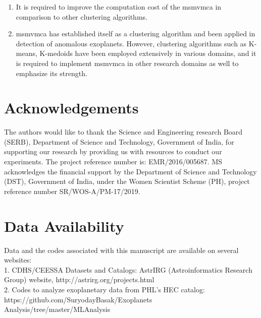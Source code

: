 \documentclass[fleqn,usenatbib]{mnras}
\begin{document}
\begin{enumerate}
\item It is required to improve the computation cost of the \acrshort{msmvmca} in comparison to other clustering algorithms.
\item \acrshort{msmvmca} has established itself as a clustering algorithm and been applied in detection of anomalous exoplanets. However, clustering algorithms such as K-means, K-medoids have been employed extensively in various domains, and it is required to implement \acrshort{msmvmca} in other research domains as well to emphasize its strength.
\end{enumerate}

\section*{Acknowledgements}

The authors would like to thank the Science and Engineering research Board (SERB), Department of Science and Technology, Government of India, for supporting our research by providing us with resources to conduct our experiments. The project reference number is: EMR/2016/005687. MS acknowledges the financial support by the Department of Science and Technology (DST), 
Government of India, under the Women Scientist Scheme (PH), project reference number SR/WOS-A/PM-17/2019.
 
\section*{Data Availability}

Data and the codes associated with this manuscript are available on several websites:\\
1. CDHS/CEESSA Datasets and Catalogs:
AstrIRG (Astroinformatics Research Group) website, http://astrirg.org/projects.html\\
2. Codes to analyze exoplanetary data from PHL's HEC catalog:  https://github.com/SuryodayBasak/Exoplanets\\Analysis/tree/master/MLAnalysis

\end{document}
